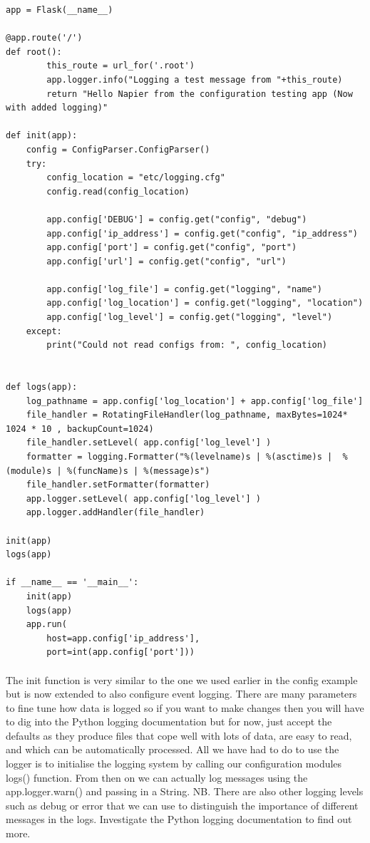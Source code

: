 \documentclass[12pt, a4paper, oneside]{book}
\begin{document}
{\begin{lstlisting}
app = Flask(__name__)

@app.route('/')
def root():
        this_route = url_for('.root')
        app.logger.info("Logging a test message from "+this_route)
        return "Hello Napier from the configuration testing app (Now with added logging)" 

def init(app):
    config = ConfigParser.ConfigParser()
    try:
        config_location = "etc/logging.cfg"
        config.read(config_location)
        
        app.config['DEBUG'] = config.get("config", "debug")
        app.config['ip_address'] = config.get("config", "ip_address")
        app.config['port'] = config.get("config", "port")
        app.config['url'] = config.get("config", "url")

        app.config['log_file'] = config.get("logging", "name")
        app.config['log_location'] = config.get("logging", "location")
        app.config['log_level'] = config.get("logging", "level")
    except:
        print("Could not read configs from: ", config_location)


def logs(app):
    log_pathname = app.config['log_location'] + app.config['log_file']
    file_handler = RotatingFileHandler(log_pathname, maxBytes=1024* 1024 * 10 , backupCount=1024)
    file_handler.setLevel( app.config['log_level'] )
    formatter = logging.Formatter("%(levelname)s | %(asctime)s |  %(module)s | %(funcName)s | %(message)s")
    file_handler.setFormatter(formatter)
    app.logger.setLevel( app.config['log_level'] )
    app.logger.addHandler(file_handler)

init(app)
logs(app)

if __name__ == '__main__':
    init(app)
    logs(app)
    app.run(
        host=app.config['ip_address'], 
        port=int(app.config['port']))
\end{lstlisting}
\paragraph{} The init function is very similar to the one we used earlier in the config example but is now extended to also configure event logging. There are many parameters to fine tune how data is logged so if you want to make changes then you will have to dig into the Python logging documentation but for now, just accept the defaults as they produce files that cope well with lots of data, are easy to read, and which can be automatically processed. All we have had to do to use the logger is to initialise the logging system by calling our configuration modules logs() function. From then on we can actually log messages using the app.logger.warn() and passing in a String. NB. There are also other logging levels such as debug or error that we can use to distinguish the importance of different messages in the logs. Investigate the Python logging documentation to find out more. 

}
\end{document}

